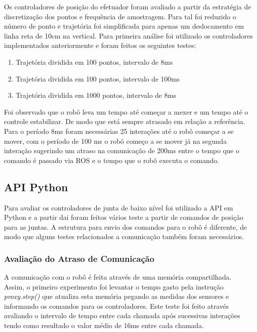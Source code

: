 Os controladores de posição do efetuador foram avaliado a partir da estratégia de discretização dos pontos e frequência de amostragem. Para tal foi reduzido o número de ponto e trajetória foi simplificada para apenas um deslocamento em linha reta de 10cm na vertical. Para primeira análise foi utilizado os controladores implementados anteriormente e foram feitos os seguintes testes:

\begin{enumerate}
    \item Trajetória dividida em 100 pontos, intervalo de 8ms
    \item Trajetória dividida em 100 pontos, intervalo de 100ms
    \item Trajetória dividida em 1000 pontos, intervalo de 8ms
\end{enumerate}

Foi observado que o robô leva um tempo até começar a mexer e um tempo até o controle estabilizar. De modo que está sempre atrasado em relação a referência. Para o período 8ms foram necessárias 25 interações até o robô começar a se mover, com o período de 100 ms o robô começo a se mover já na segunda interação sugerindo um atraso na comunicação de 200ms entre o tempo que o comando é passado via ROS e o tempo que o robô executa o comando.


\subsection{API Python}

Para avaliar os controladores de junta de baixo nível foi utilizado a API em Python e a partir dai foram feitos vários teste a partir de comandos de posição para as juntas. A estrutura para envio dos comandos para o robô é diferente, de modo que alguns testes relacionados a comunicação também foram necessários.

\subsubsection{Avaliação do Atraso de Comunicação}
A comunicação com o robô é feita através de uma memória compartilhada. Assim, o primeiro experimento foi levantar o tempo gasto pela instrução \textit{proxy.step()} que atualiza esta memória pegando as medidas dos sensores e informando os comandos para os controladores. Este teste foi feito através avaliando o intervalo de tempo entre cada chamada após sucessivas interações tendo como resultado o valor médio de 16ms entre cada chamada.


